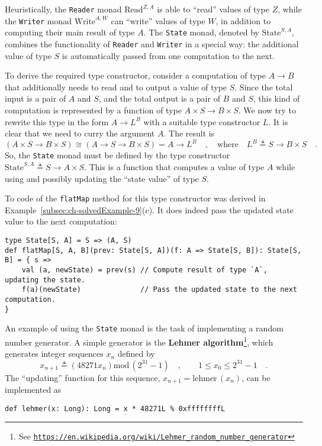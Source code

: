 Heuristically, the \lstinline!Reader! monad $\text{Read}^{Z,A}$
is able to \textsf{``}read\textsf{''} values of type $Z$, while the \lstinline!Writer!
monad $\text{Write}^{A,W}$ can \textsf{``}write\textsf{''} values of type $W$, in
addition to computing their main result of type $A$. The \lstinline!State!
monad, denoted by $\text{State}^{S,A}$, combines the functionality
of \lstinline!Reader! and \lstinline!Writer! in a special way: the
additional value of type $S$ is automatically passed from one computation
to the next. 

To derive the required type constructor, consider a computation of
type $A\rightarrow B$ that additionally needs to read and to output
a value of type $S$. Since the total input is a pair of $A$ and
$S$, and the total output is a pair of $B$ and $S$, this kind of
computation is represented by a function of type $A\times S\rightarrow B\times S$.
We now try to rewrite this type in the form $A\rightarrow L^{B}$
with a suitable type constructor $L$. It is clear that we need to
curry the argument $A$. The result is 
\[
\left(A\times S\rightarrow B\times S\right)\cong\left(A\rightarrow S\rightarrow B\times S\right)=A\rightarrow L^{B}\quad,\quad\text{where}\quad L^{B}\triangleq S\rightarrow B\times S\quad.
\]
So, the \lstinline!State!
monad must be defined by the type constructor $\text{State}^{S,A}\triangleq S\rightarrow A\times S$.
This is a function that computes a value of type $A$ while using
and possibly updating the \textsf{``}state value\textsf{''} of type $S$.

To code of the \lstinline!flatMap! method for this type constructor
was derived in Example~\ref{subsec:ch-solvedExample-9}(c). It does
indeed pass the updated state value to the next computation:
\begin{lstlisting}
type State[S, A] = S => (A, S)
def flatMap[S, A, B](prev: State[S, A])(f: A => State[S, B]): State[S, B] = { s =>
    val (a, newState) = prev(s) // Compute result of type `A`, updating the state.
    f(a)(newState)              // Pass the updated state to the next computation.
}
\end{lstlisting}

An example of using the \lstinline!State! monad is the task of implementing
a random number generator. A simple generator is the \textbf{Lehmer
algorithm}\footnote{See \texttt{\href{https://en.wikipedia.org/wiki/Lehmer_random_number_generator}{https://en.wikipedia.org/wiki/Lehmer\_random\_number\_generator}}},
which generates integer sequences $x_{n}$ defined by
\[
x_{n+1}\triangleq\left(48271x_{n}\right)\text{mod}\,(2^{31}-1)\quad,\quad\quad1\leq x_{0}\leq2^{31}-1\quad.
\]
The \textsf{``}updating\textsf{''} function for this sequence, $x_{n+1}=\text{lehmer}\,(x_{n})$,
can be implemented as 
\begin{lstlisting}
def lehmer(x: Long): Long = x * 48271L % 0xffffffffL
\end{lstlisting}

